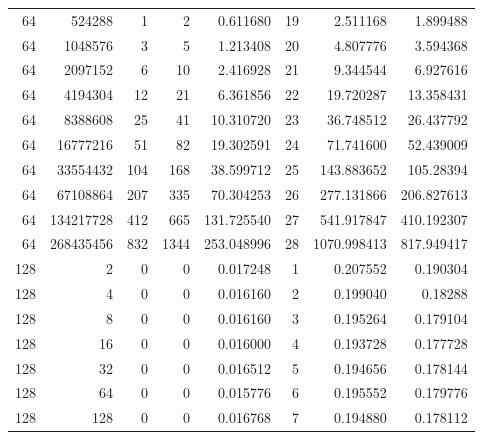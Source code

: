 \begin{longtable}[c]{@{}rrrrrrrr@{}}
    64        & 524288    & 1         & 2        & 0.611680    & 19                  & 2.511168    & 1.899488   \\
    64        & 1048576   & 3         & 5        & 1.213408    & 20                  & 4.807776    & 3.594368   \\
    64        & 2097152   & 6         & 10       & 2.416928    & 21                  & 9.344544    & 6.927616   \\
    64        & 4194304   & 12        & 21       & 6.361856    & 22                  & 19.720287   & 13.358431  \\
    64        & 8388608   & 25        & 41       & 10.310720   & 23                  & 36.748512   & 26.437792  \\
    64        & 16777216  & 51        & 82       & 19.302591   & 24                  & 71.741600   & 52.439009  \\
    64        & 33554432  & 104       & 168      & 38.599712   & 25                  & 143.883652  & 105.28394  \\
    64        & 67108864  & 207       & 335      & 70.304253   & 26                  & 277.131866  & 206.827613 \\
    64        & 134217728 & 412       & 665      & 131.725540  & 27                  & 541.917847  & 410.192307 \\
    64        & 268435456 & 832       & 1344     & 253.048996  & 28                  & 1070.998413 & 817.949417 \\
    128       & 2         & 0         & 0        & 0.017248    & 1                   & 0.207552    & 0.190304   \\
    128       & 4         & 0         & 0        & 0.016160    & 2                   & 0.199040    & 0.18288    \\
    128       & 8         & 0         & 0        & 0.016160    & 3                   & 0.195264    & 0.179104   \\
    128       & 16        & 0         & 0        & 0.016000    & 4                   & 0.193728    & 0.177728   \\
    128       & 32        & 0         & 0        & 0.016512    & 5                   & 0.194656    & 0.178144   \\
    128       & 64        & 0         & 0        & 0.015776    & 6                   & 0.195552    & 0.179776   \\
    128       & 128       & 0         & 0        & 0.016768    & 7                   & 0.194880    & 0.178112   \\

\end{longtable}
